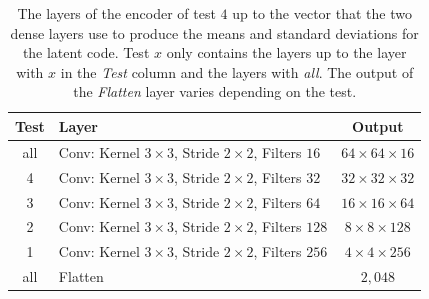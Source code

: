 \begin{center}
    \begin{table}[H]
        \centering
        \begin{tabular}{ | c | l | c | }
            \hline
            Test &Layer & Output\\ \hline
            all &Conv: Kernel $3\times3$, Stride $2\times2$, Filters $16 $    & $64\times 64\times 16 $    \\  
            4   &Conv: Kernel $3\times3$, Stride $2\times2$, Filters $32 $    & $32\times 32\times 32 $    \\
            3   &Conv: Kernel $3\times3$, Stride $2\times2$, Filters $64 $    & $16\times 16\times 64 $    \\
            2   &Conv: Kernel $3\times3$, Stride $2\times2$, Filters $128$    & $8\times 8\times   128$    \\
            1   &Conv: Kernel $3\times3$, Stride $2\times2$, Filters $256$    & $4\times 4\times   256$    \\
            all &Flatten                                                      & $2,048$                    \\
            \hline
        \end{tabular} 
        \caption{The layers of the encoder of test $4$ up to the vector that the two dense layers use to produce 
        the means and standard deviations for the latent code. Test $x$ only contains the layers up to
        the layer with $x$ in the \textit{Test} column and the layers with \textit{all}.
         The output of the \textit{Flatten} layer
        varies depending on the test.}
    \end{table}
\end{center}
\vspace{-4em}

